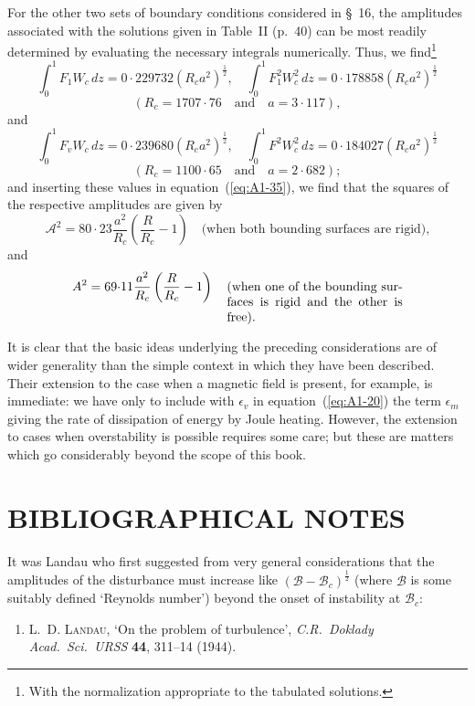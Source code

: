 For the other two sets of boundary conditions considered in \S~16, the amplitudes associated with the solutions given in Table~II (p.~40) can be most readily determined by evaluating the necessary integrals numerically. Thus, we find\footnote{With the normalization appropriate to the tabulated solutions.}
\begin{equation}
\label{eq:A1-38}
\int_0^1 F_1 W_c \, dz = 0{\cdot}229732(R_c a^2)^{\frac{1}{2}}, \quad \int_0^1 F_1^2 W_c^2 \, dz = 0{\cdot}178858(R_c a^2)^{\frac{1}{2}}
\end{equation}
\[
(R_c = 1707{\cdot}76 \quad \text{and} \quad a = 3{\cdot}117),
\]
and
\begin{equation}
\label{eq:A1-39}
\int_0^1 F_v W_c \, dz = 0{\cdot}239680(R_c a^2)^{\frac{1}{2}}, \quad \int_0^1 F^2 W_c^2 \, dz = 0{\cdot}184027(R_c a^2)^{\frac{1}{2}}
\end{equation}
\[
(R_c = 1100{\cdot}65 \quad \text{and} \quad a = 2{\cdot}682);
\]
and inserting these values in equation~(\ref{eq:A1-35}), we find that the squares of the respective amplitudes are given by
\begin{equation}
\label{eq:A1-40}
\mathscr{A}^2 = 80{\cdot}23 \frac{a^2}{R_c} \left( \frac{R}{R_c} - 1 \right) \quad \text{(when both bounding surfaces are rigid),}
\end{equation}
and
\begin{equation}
\label{eq:A1-41}
\mathscr{A}^2 = 69{\cdot}11 \frac{a^2}{R_c} \left( \frac{R}{R_c} - 1 \right) \quad \parbox[t]{0.4\textwidth}{(when one of the bounding surfaces is rigid and the other is free).}
\end{equation}

It is clear that the basic ideas underlying the preceding considerations are of wider generality than the simple context in which they have been described. Their extension to the case when a magnetic field is present, for example, is immediate: we have only to include with $\epsilon_v$ in equation~(\ref{eq:A1-20}) the term $\epsilon_m$ giving the rate of dissipation of energy by Joule heating. However, the extension to cases when overstability is possible requires some care; but these are matters which go considerably beyond the scope of this book.

\section*{BIBLIOGRAPHICAL NOTES}

It was Landau who first suggested from very general considerations that the amplitudes of the disturbance must increase like $(\mathscr{B} - \mathscr{B}_c)^{\frac{1}{2}}$ (where $\mathscr{B}$ is some suitably defined `Reynolds number') beyond the onset of instability at $\mathscr{B}_c$:
\begin{enumerate}
\item L.~D. \textsc{Landau}, `On the problem of turbulence', \textit{C.R.\ Doklady Acad.\ Sci.\ URSS} \textbf{44}, 311--14 (1944).
\end{enumerate}

